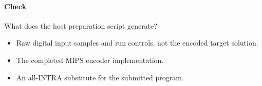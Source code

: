 \paragraph{Check} What does the host preparation script generate?
\begin{itemize}
  \item[A.] Raw digital input samples and run controls, not the encoded target solution.
  \item[B.] The completed MIPS encoder implementation.
  \item[C.] An all-INTRA substitute for the submitted program.
\end{itemize}
